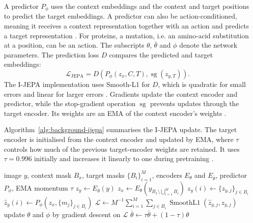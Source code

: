 A predictor $P_\phi$ uses the context embeddings and the context and target positions to predict the target embeddings. A predictor can also be action-conditioned, meaning it receives a context representation together with an action and predicts a target representation \citep{shihabi2026hijepa}. For proteins, a mutation, i.e. an amino-acid substitution at a position, can be an action. The subscripts $\theta$, $\bar\theta$ and $\phi$ denote the network parameters. The prediction loss $D$ compares the predicted and target embeddings:
\begin{equation}
\mathcal{L}_{\mathrm{JEPA}}
=D\!\left(P_\phi(z_x,C,T),\operatorname{sg}(z_{y,T})\right).
\label{eq:background-jepa-prediction}
\end{equation}
The I-JEPA implementation uses Smooth-L1 for $D$, which is quadratic for small errors and linear for larger errors \citep{ijepa-code}.
Gradients update the context encoder and predictor, while the stop-gradient operation $\operatorname{sg}$ prevents updates through the target encoder. Its weights are an EMA of the context encoder's weights \citep{assran2023ijepa,caron2021dino}.

Algorithm~\ref{alg:background-ijepa} summarises the I-JEPA update. The target encoder is initialised from the context encoder and updated by EMA, where $\tau$ controls how much of the previous target-encoder weights are retained. It uses $\tau=0.996$ initially and increases it linearly to one during pretraining \citep{assran2023ijepa}.

\begin{algorithm}[hbt!]
\caption{I-JEPA student-teacher update \citep{assran2023ijepa}}
\label{alg:background-ijepa}
\begin{algorithmic}[1]
\Require image $y$, context mask $B_x$, target masks $\{B_i\}_{i=1}^{M}$, encoders $E_\theta$ and $E_{\bar\theta}$, predictor $P_\phi$, EMA momentum $\tau$
\State $z_y \gets E_{\bar\theta}(y)$ 
\State $z_x\gets E_\theta\!\left(y_{B_x\setminus\bigcup_{i=1}^{M}B_i}\right)$ 
    \State $z_y(i)\gets\{z_{y,j}\}_{j\in B_i}$ 
    \State $\hat z_y(i)\gets P_\phi\!\left(z_x,\{m_j\}_{j\in B_i}\right)$ 
\EndFor
\State $\mathcal{L}\gets M^{-1}\sum_{i=1}^{M}\sum_{j\in B_i}\operatorname{SmoothL1}(\hat z_{y,j},z_{y,j})$
\State update $\theta$ and $\phi$ by gradient descent on $\mathcal{L}$
\State $\bar\theta \gets \tau\bar\theta+(1-\tau)\theta$ 
\end{algorithmic}
\end{algorithm}


